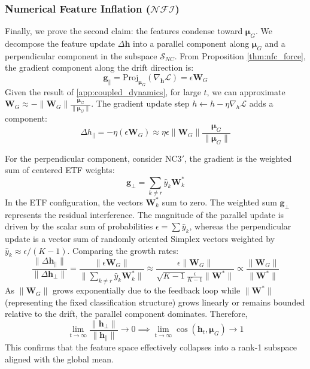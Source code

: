 \documentclass{article}
\theoremstyle{plain}
\theoremstyle{definition}
\theoremstyle{remark}
\begin{document}
\subsubsection{Numerical Feature Inflation ($\mathcal{NFI}$)}
Finally, we prove the second claim: the features condense toward $\bm{\mu}_G$.
We decompose the feature update $\Delta \bm{h}$ into a parallel component along $\bm{\mu}_G$ and a perpendicular component in the subspace $\mathcal{S}_{NC}$.
From Proposition \ref{thm:nfc_force}, the gradient component along the drift direction is:
\begin{equation}
    \bm{g}_{\parallel} = \text{Proj}_{\bm{\mu}_G}(\nabla_{\bm{h}} \mathcal{L}) = \epsilon \bm{W}_G
\end{equation}
Given the result of \cref{app:coupled_dynamics}, for large $t$, we can approximate $\bm{W}_G \approx -\|\bm{W}_G\| \frac{\bm{\mu}_G}{\|\bm{\mu}_G\|}$. 
The gradient update step $h \leftarrow h - \eta \nabla_h \mathcal{L}$ adds a component:
\begin{equation}
\Delta h_{\parallel} = -\eta (\epsilon \bm{W}_G) \approx \eta \epsilon \|\bm{W}_G\| \frac{\bm{\mu}_G}{\|\bm{\mu}_G\|}
\end{equation}

For the perpendicular component, consider NC3$'$, the gradient is the weighted sum of centered ETF weights:
\begin{equation}
    \bm{g}_{\perp} = \sum_{k \neq r} \hat{y}_k \bm{W}_k^*
\end{equation}
In the ETF configuration, the vectors $\bm{W}_k^*$ sum to zero. 
The weighted sum $\bm{g}_{\perp}$ represents the residual interference. 
The magnitude of the parallel update is driven by the scalar sum of probabilities $\epsilon = \sum \hat{y}_k$,
 whereas the perpendicular update is a vector sum of randomly oriented Simplex vectors weighted by $\hat{y}_k \approx \epsilon/(K-1)$.
Comparing the growth rates:
\begin{equation}
    \frac{\|\Delta \bm{h}_{\parallel}\|}{\|\Delta \bm{h}_{\perp}\|} = \frac{\|\epsilon \bm{W}_G\|}{\|\sum_{k \neq r} \hat{y}_k \bm{W}_k^*\|} \approx \frac{\epsilon \|\bm{W}_G\|}{\sqrt{K-1} \frac{\epsilon}{K-1} \|\bm{W}^*\|} \propto \frac{\|\bm{W}_G\|}{\|\bm{W}^*\|}
\end{equation}
As $\|\bm{W}_G\|$ grows exponentially due to the feedback loop while $\|\bm{W}^*\|$ (representing the fixed classification structure) grows linearly or remains bounded relative to the drift, the parallel component dominates.
Therefore,
\begin{equation}
    \lim_{t \to \infty} \frac{\|\bm{h}_{\perp}\|}{\|\bm{h}_{\parallel}\|} \to 0 \implies \lim_{t \to \infty} \cos(\bm{h}_t, \bm{\mu}_G) \to 1
\end{equation}
This confirms that the feature space effectively collapses into a rank-1 subspace aligned with the global mean.
\end{document}

